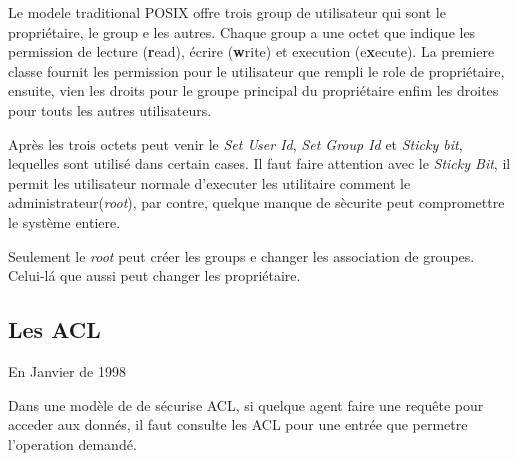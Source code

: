 \documentclass[draft]{article}
\begin{document}
Le modele traditional POSIX offre trois group de utilisateur qui sont le propriétaire, le group e les autres. Chaque group a une octet que indique les permission de lecture (\textbf{r}ead), écrire (\textbf{w}rite) et execution (e\textbf{x}ecute). La premiere classe fournit les permission pour le utilisateur que rempli le role de propriétaire, ensuite, vien les droits pour le groupe principal du propriétaire enfim les droites pour touts les autres utilisateurs. 
 
Après les trois octets peut venir le \emph{Set User Id}, \emph{Set Group Id} et \emph{Sticky bit}, lequelles sont utilisé dans certain cases. Il faut faire attention avec le \emph{Sticky Bit}, il permit les utilisateur normale d'executer les utilitaire comment le administrateur(\emph{root}), par contre, quelque manque de sècurite peut compromettre le système entiere.

Seulement le \emph{root} peut créer les groups e changer les association de groupes. Celui-lá que aussi peut changer les propriétaire.  

\subsection*{Les ACL}




En Janvier de 1998\cite{aclsuse}


Dans une modèle de de sécurise ACL, si quelque agent faire une requête pour acceder aux donnés, il faut consulte les ACL pour une entrée que permetre l'operation demandé.    
\end{document}
